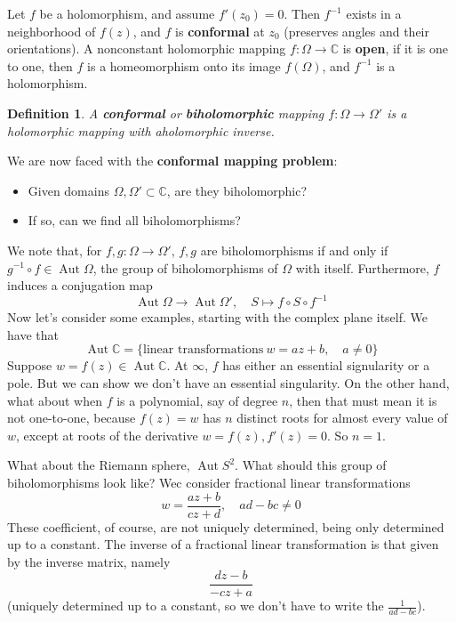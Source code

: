 \documentclass{article}
\newcommand{\mbb}[1]{\mathbb{#1}}
\newtheorem{definition}{Definition}
\DeclareMathOperator{\Aut}{Aut}
\begin{document}
Let \(f\) be a holomorphism, and assume \(f'(z_0) = 0\). Then \(f^{-1}\) exists in a neighborhood of \(f(z)\), and \(f\) is \textbf{conformal} at \(z_0\) (preserves angles and their orientations). A nonconstant holomorphic mapping \(f: \Omega \to \mbb{C}\) is \textbf{open}, if it is one to one, then \(f\) is a homeomorphism onto its image \(f(\Omega)\), and \(f^{-1}\) is a holomorphism.
\begin{definition}
A \textbf{conformal} or \textbf{biholomorphic} mapping \(f: \Omega \to \Omega'\) is a holomorphic mapping with aholomorphic inverse.
\end{definition}
We are now faced with the \textbf{conformal mapping problem}:
\begin{itemize}

  \item Given domains \(\Omega, \Omega' \subset \mbb{C}\), are they biholomorphic?

  \item If so, can we find all biholomorphisms?

\end{itemize}
We note that, for \(f, g: \Omega \to \Omega'\), \(f, g\) are biholomorphisms if and only if \(g^{-1} \circ f \in \Aut\Omega\), the group of biholomorphisms of \(\Omega\) with itself. Furthermore, \(f\) induces a conjugation map
\[\Aut\Omega \to \Aut\Omega', \quad S \mapsto f \circ S \circ f^{-1}\]
Now let's consider some examples, starting with the complex plane itself. We have that
\[\Aut\mbb{C} = \{\text{linear transformations} \ w = az + b, \quad a \neq 0\}\]
Suppose \(w = f(z) \in \Aut\mbb{C}\). At \(\infty\), \(f\) has either an essential signularity or a pole. But we can show we don't have an essential singularity. On the other hand, what about when \(f\) is a polynomial, say of degree \(n\), then that must mean it is not one-to-one, because
\(f(z) = w\) has \(n\) distinct roots for almost every value of \(w\), except at roots of the derivative \(w = f(z), f'(z) = 0\). So \(n = 1\).

What about the Riemann sphere, \(\Aut S^2\). What should this group of biholomorphisms look like? Wec consider fractional linear transformations
\[w = \frac{az + b}{cz + d}, \quad ad - bc \neq 0\]
These coefficient, of course, are not uniquely determined, being only determined up to a constant. The inverse of a fractional linear transformation is that given by the inverse matrix, namely
\[\frac{dz - b}{-cz + a}\]
(uniquely determined up to a constant, so we don't have to write the \(\frac{1}{ad - bc}\)).
\end{document}
